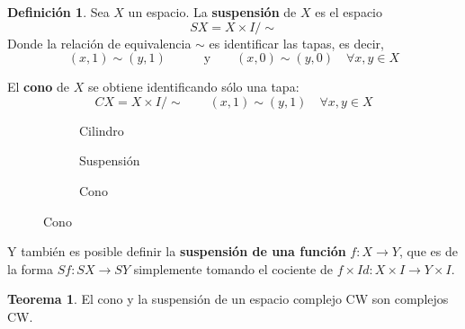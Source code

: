 \documentclass[spanish]{book}
\theoremstyle{definition}
\newtheorem*{defn}{Definición}
\newtheorem*{teo}{Teorema}
\begin{document}
	\begin{defn}
		Sea $X$ un espacio. La \textbf{suspensión} de $X$ es el espacio
				\[SX=X\times I/\sim\]
		Donde la relación de equivalencia $\sim$ es identificar las tapas, es decir,
		\[(x,1)\sim(y,1)\quad\qquad\text{y}\qquad(x,0)\sim(y,0)\quad\forall x,y\in X\]
		
		El \textbf{cono} de $X$ se obtiene identificando sólo una tapa: 
			\[CX=X\times I/\sim\qquad(x,1)\sim(y,1)\quad\forall x,y\in X\]
	\begin{figure}[H]
	\begin{subfigure}{0.3\textwidth}
		\centering
		\caption*{Cilindro}
	\end{subfigure}
	\begin{subfigure}{0.3\textwidth}
		\centering
		\caption*{Suspensión}
	\end{subfigure}
	\begin{subfigure}{0.3\textwidth}
		\centering
		\caption*{Cono}
	\end{subfigure}
	\end{figure}
	\label{fsusp}Y también es posible definir la \textbf{suspensión de una función} $f:X\to Y$, que es de la forma $Sf:SX\to SY$ simplemente tomando el cociente de $f\times Id:X\times I\to Y\times I$.
	\end{defn}
	\begin{teo}
		El cono y la suspensión de un espacio complejo CW son complejos CW.
	\end{teo}
\end{document}
